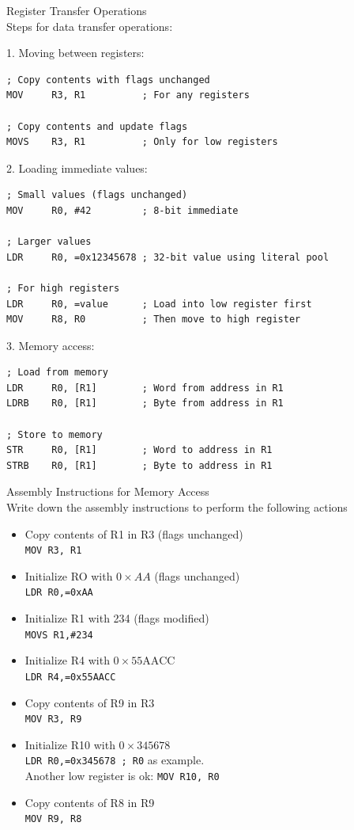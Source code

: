 \begin{KR}{Register Transfer Operations}\\
Steps for data transfer operations:

1. Moving between registers:
\begin{lstlisting}[language=armasm, style=basesmol]
; Copy contents with flags unchanged
MOV     R3, R1          ; For any registers

; Copy contents and update flags
MOVS    R3, R1          ; Only for low registers
\end{lstlisting}

2. Loading immediate values:
\begin{lstlisting}[language=armasm, style=basesmol]
; Small values (flags unchanged)
MOV     R0, #42         ; 8-bit immediate

; Larger values
LDR     R0, =0x12345678 ; 32-bit value using literal pool

; For high registers
LDR     R0, =value      ; Load into low register first
MOV     R8, R0          ; Then move to high register
\end{lstlisting}

3. Memory access:
\begin{lstlisting}[language=armasm, style=basesmol]
; Load from memory
LDR     R0, [R1]        ; Word from address in R1
LDRB    R0, [R1]        ; Byte from address in R1

; Store to memory
STR     R0, [R1]        ; Word to address in R1
STRB    R0, [R1]        ; Byte to address in R1
\end{lstlisting}
\end{KR}

\begin{example2}{Assembly Instructions for Memory Access}\\
Write down the assembly instructions to perform the following actions
\begin{itemize}
  \item Copy contents of R1 in R3 (flags unchanged)\\
  \texttt{MOV R3, R1}
  \item Initialize RO with $0 \times A A$ (flags unchanged)\\
  \texttt{LDR R0,=0xAA}
  \item Initialize R1 with 234 (flags modified)\\
  \texttt{MOVS R1,\#234}
  \item Initialize R4 with $0 \times 55 \mathrm{AACC}$\\
  \texttt{LDR R4,=0x55AACC}
  \item Copy contents of R9 in R3\\
  \texttt{MOV R3, R9}
  \item Initialize R10 with $0 \times 345678$\\
  \texttt{LDR R0,=0x345678 ; R0} as example. \\Another low register is ok:
  \texttt{MOV R10, R0}
  \item Copy contents of R8 in R9\\
  \texttt{MOV R9, R8}
\end{itemize}
\end{example2}



